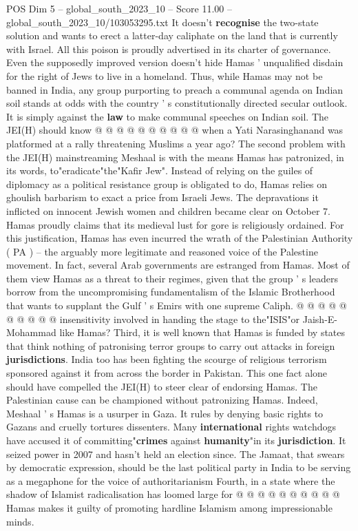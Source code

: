 \begin{textsample}{POS Dim 5 – global\_south\_2023\_10 – Score 11.00 – global\_south\_2023\_10/103053295.txt}
It doesn't \textbf{recognise} the two-state solution and wants to erect a latter-day caliphate on the land that is currently with Israel.
All this poison is proudly advertised in its charter of governance.
Even the supposedly improved version doesn't hide Hamas ' unqualified disdain for the right of Jews to live in a homeland.
Thus, while Hamas may not be banned in India, any group purporting to preach a communal agenda on Indian soil stands at odds with the country ' s constitutionally directed secular outlook.
It is simply against the \textbf{law} to make communal speeches on Indian soil.
The JEI(H) should know @ @ @ @ @ @ @ @ @ @ when a Yati Narasinghanand was platformed at a rally threatening Muslims a year ago?
The second problem with the JEI(H) mainstreaming Meshaal is with the means Hamas has patronized, in its words, to"eradicate"the"Kafir Jew".
Instead of relying on the guiles of diplomacy as a political resistance group is obligated to do, Hamas relies on ghoulish barbarism to exact a price from Israeli Jews.
The depravations it inflicted on innocent Jewish women and children became clear on October 7.
Hamas proudly claims that its medieval lust for gore is religiously ordained.
For this justification, Hamas has even incurred the wrath of the Palestinian Authority ( PA ) -- the arguably more legitimate and reasoned voice of the Palestine movement.
In fact, several Arab governments are estranged from Hamas.
Most of them view Hamas as a threat to their regimes, given that the group ' s leaders borrow from the uncompromising fundamentalism of the Islamic Brotherhood that wants to supplant the Gulf ' s Emirs with one supreme Caliph. @ @ @ @ @ @ @ @ @ @ insensitivity involved in handing the stage to the"ISIS"or Jaish-E-Mohammad like Hamas?
Third, it is well known that Hamas is funded by states that think nothing of patronising terror groups to carry out attacks in foreign \textbf{jurisdictions}.
India too has been fighting the scourge of religious terrorism sponsored against it from across the border in Pakistan.
This one fact alone should have compelled the JEI(H) to steer clear of endorsing Hamas.
The Palestinian cause can be championed without patronizing Hamas.
Indeed, Meshaal ' s Hamas is a usurper in Gaza.
It rules by denying basic rights to Gazans and cruelly tortures dissenters.
Many \textbf{international} rights watchdogs have accused it of committing"\textbf{crimes} against \textbf{humanity}"in its \textbf{jurisdiction}.
It seized power in 2007 and hasn't held an election since.
The Jamaat, that swears by democratic expression, should be the last political party in India to be serving as a megaphone for the voice of authoritarianism Fourth, in a state where the shadow of Islamist radicalisation has loomed large for @ @ @ @ @ @ @ @ @ @ Hamas makes it guilty of promoting hardline Islamism among impressionable minds.

\end{textsample}
